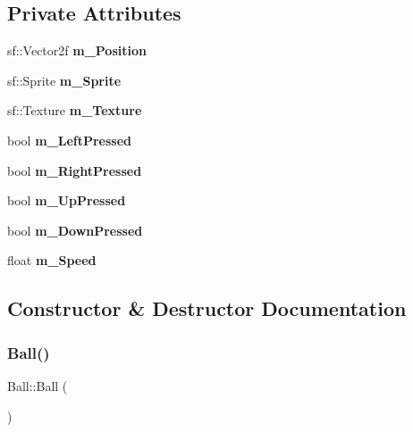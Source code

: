 \subsection*{Private Attributes}
\begin{DoxyCompactItemize}
\item 
\mbox{\label{class_ball_a49175b3cfeb34dc1b7c447c497052e45}} 
sf\+::\+Vector2f {\bfseries m\+\_\+\+Position}
\item 
\mbox{\label{class_ball_a147ce98ebf912fd11a5d882b2c1a44b9}} 
sf\+::\+Sprite {\bfseries m\+\_\+\+Sprite}
\item 
\mbox{\label{class_ball_a2569926cbfb87230450abe31a941f764}} 
sf\+::\+Texture {\bfseries m\+\_\+\+Texture}
\item 
\mbox{\label{class_ball_a6bdcc637cf2366913c93a3edefe25317}} 
bool {\bfseries m\+\_\+\+Left\+Pressed}
\item 
\mbox{\label{class_ball_a9ffb31c73f3051432574e67a5d6eb9a9}} 
bool {\bfseries m\+\_\+\+Right\+Pressed}
\item 
\mbox{\label{class_ball_a217feea231defb4343e354ac9d71e8f6}} 
bool {\bfseries m\+\_\+\+Up\+Pressed}
\item 
\mbox{\label{class_ball_a758d567bda0be6a47d949aa70ee2a9ce}} 
bool {\bfseries m\+\_\+\+Down\+Pressed}
\item 
\mbox{\label{class_ball_a616abdd96de430aab960d9c42dea986c}} 
float {\bfseries m\+\_\+\+Speed}
\end{DoxyCompactItemize}


\subsection{Constructor \& Destructor Documentation}
\mbox{\label{class_ball_a86a144d3dad6c953e422e32435923bbb}} 
\subsubsection{\texorpdfstring{Ball()}{Ball()}}
{\footnotesize\ttfamily Ball\+::\+Ball (\begin{DoxyParamCaption}{ }\end{DoxyParamCaption})}



